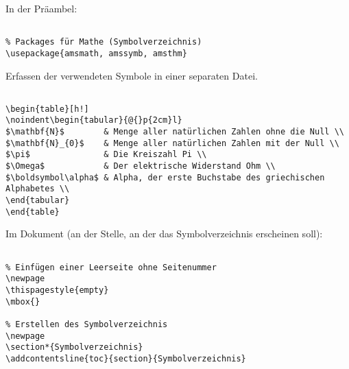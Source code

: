 
In der Präambel:

\begin{verbatim}

% Packages für Mathe (Symbolverzeichnis)
\usepackage{amsmath, amssymb, amsthm}

\end{verbatim}

\tcblower

Erfassen der verwendeten Symbole in einer separaten Datei.

\begin{verbatim}

\begin{table}[h!]
\noindent\begin{tabular}{@{}p{2cm}l}
$\mathbf{N}$        & Menge aller natürlichen Zahlen ohne die Null \\
$\mathbf{N}_{0}$    & Menge aller natürlichen Zahlen mit der Null \\
$\pi$               & Die Kreiszahl Pi \\
$\Omega$            & Der elektrische Widerstand Ohm \\
$\boldsymbol\alpha$ & Alpha, der erste Buchstabe des griechischen Alphabetes \\
\end{tabular}
\end{table}

\end{verbatim}

Im Dokument (an der Stelle, an der das Symbolverzeichnis erscheinen soll): 

\begin{verbatim}

% Einfügen einer Leerseite ohne Seitenummer
\newpage
\thispagestyle{empty}
\mbox{}

% Erstellen des Symbolverzeichnis
\newpage
\section*{Symbolverzeichnis}
\addcontentsline{toc}{section}{Symbolverzeichnis}


\end{verbatim}
